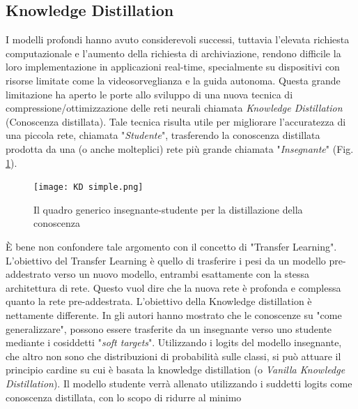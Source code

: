 \subsection{Knowledge Distillation}\label{KD_distill}
I modelli profondi hanno avuto considerevoli successi, tuttavia l'elevata richiesta 
computazionale e l'aumento della richiesta di archiviazione, rendono 
difficile la loro implementazione in applicazioni real-time, specialmente su 
dispositivi con risorse limitate come la videosorveglianza e la guida autonoma. 
Questa grande limitazione ha aperto le porte allo sviluppo di una 
nuova tecnica di compressione/ottimizzazione delle reti neurali chiamata 
\emph{Knowledge Distillation} (Conoscenza distillata). Tale tecnica risulta utile 
per migliorare l'accuratezza di una piccola rete, chiamata "\emph{Studente}", trasferendo 
la conoscenza distillata prodotta da una (o anche molteplici) rete 
più grande chiamata "\emph{Insegnante}" (Fig. \ref{KD_simple}).
\begin{figure}
    \centering
    \texttt{[image: KD simple.png]}
    \centering
    \caption{Il quadro generico insegnante-studente per la distillazione della conoscenza}
    \label{KD_simple}
\end{figure}
È bene non confondere tale 
argomento con il concetto di "Transfer Learning". L'obiettivo del Transfer 
Learning è quello di trasferire i pesi da un modello pre-addestrato verso 
un nuovo modello, entrambi esattamente con la stessa architettura di rete. 
Questo vuol dire che la nuova rete è profonda e complessa quanto la rete pre-addestrata.
L'obiettivo della Knowledge distillation è nettamente differente.
In \cite{hinton2015distilling} gli autori hanno mostrato che le conoscenze su "come generalizzare", 
possono essere trasferite da un insegnante verso uno studente mediante i 
cosiddetti "\emph{soft targets}". Utilizzando i logits del modello insegnante, che 
altro non sono che distribuzioni di probabilità sulle classi, si può attuare 
il principio cardine su cui è basata la knowledge distillation (o \emph{Vanilla 
Knowledge Distillation}). Il modello studente verrà allenato utilizzando i 
suddetti logits come conoscenza distillata, con lo scopo di ridurre al minimo 
